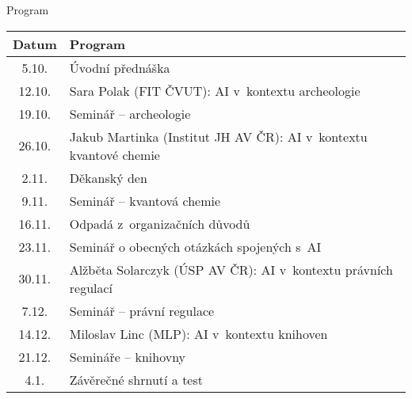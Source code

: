\begin{frame}{Program}

    \small\centering
    \begin{tabular}{cl}
        \toprule
    Datum   &   Program \\ \midrule
    5.10.  &   Úvodní přednáška \\
			12.10.  & Sara Polak (FIT ČVUT): AI v~kontextu archeologie \\
			19.10.  & Seminář -- archeologie  \\ \midrule
			26.10.  & Jakub Martinka (Institut JH AV ČR): AI v~kontextu kvantové chemie \\
			\color{gray} 2.11.   & \color{gray} Děkanský den \\
			9.11.   & Seminář -- kvantová chemie \\ \midrule
			\color{graz} 16.11.  & \color{gray} Odpadá z~organizačních důvodů \\ \midrule
			23.11.  & Seminář o obecných otázkách spojených s~AI \\ \midrule
			30.11.  & Alžběta Solarczyk (ÚSP AV ČR): AI v~kontextu právních regulací \\
			7.12.   & Seminář -- právní regulace \\ \midrule
			14.12.  & Miloslav Linc (MLP): AI v~kontextu knihoven \\
			21.12.  & Semináře -- knihovny \\ \midrule
			4.1.    & Závěrečné shrnutí a test  \\
    \bottomrule
    \end{tabular}


\end{frame}

